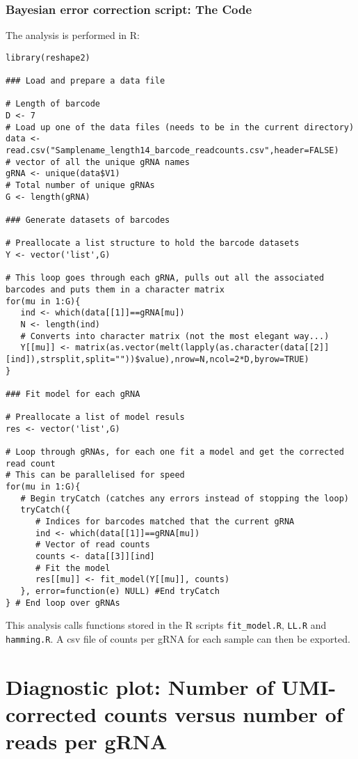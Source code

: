 \subsubsection{Bayesian error correction script: The Code}

The analysis is  performed in R:

\begin{lstlisting}
library(reshape2)

### Load and prepare a data file

# Length of barcode
D <- 7
# Load up one of the data files (needs to be in the current directory)
data <- read.csv("Samplename_length14_barcode_readcounts.csv",header=FALSE)
# vector of all the unique gRNA names
gRNA <- unique(data$V1)
# Total number of unique gRNAs
G <- length(gRNA)

### Generate datasets of barcodes

# Preallocate a list structure to hold the barcode datasets
Y <- vector('list',G)

# This loop goes through each gRNA, pulls out all the associated barcodes and puts them in a character matrix
for(mu in 1:G){
   ind <- which(data[[1]]==gRNA[mu])
   N <- length(ind)
   # Converts into character matrix (not the most elegant way...)
   Y[[mu]] <- matrix(as.vector(melt(lapply(as.character(data[[2]][ind]),strsplit,split=""))$value),nrow=N,ncol=2*D,byrow=TRUE)
}

### Fit model for each gRNA

# Preallocate a list of model resuls
res <- vector('list',G)

# Loop through gRNAs, for each one fit a model and get the corrected read count
# This can be parallelised for speed
for(mu in 1:G){
   # Begin tryCatch (catches any errors instead of stopping the loop)
   tryCatch({
      # Indices for barcodes matched that the current gRNA
      ind <- which(data[[1]]==gRNA[mu])
      # Vector of read counts
      counts <- data[[3]][ind]
      # Fit the model
      res[[mu]] <- fit_model(Y[[mu]], counts)
   }, error=function(e) NULL) #End tryCatch
} # End loop over gRNAs
\end{lstlisting}

This analysis calls functions stored in the R scripts \verb|fit_model.R|, \verb|LL.R| and \verb|hamming.R|.
A csv file of counts per gRNA for each sample can then be exported.

\section{Diagnostic plot: Number of UMI-corrected counts versus number of reads per gRNA}
\label{subsec:Diagnostic_plot Counts vs reads}

